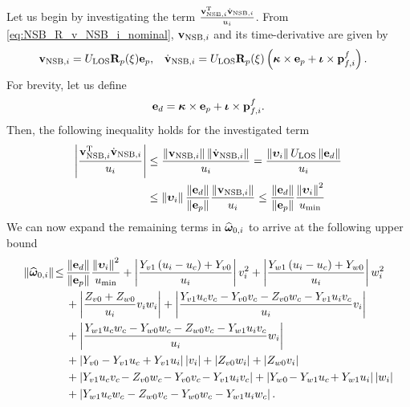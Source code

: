 Let us begin by investigating the term $\frac{\mathbf{v}_{{\rm NSB}, i}^{\mathrm{T}}\dot{\mathbf{v}}_{{\rm NSB}, i}}{u_i}$.
From \eqref{eq:NSB_R_v_NSB_i_nominal}, $\mathbf{v}_{{\rm NSB}, i}$ and its time-derivative are given by
\begin{align}
    \mathbf{v}_{{\rm NSB}, i} &= U_{\rm LOS}\mathbf{R}_p(\xi)\mathbf{e}_p, &
    \dot{\mathbf{v}}_{{\rm NSB}, i} &= U_{\rm LOS}\mathbf{R}_p(\xi)\left(\bm{\kappa}\times\mathbf{e}_p + \bm{\iota}\times\mathbf{p}_{f,i}^f\right).
\end{align}
For brevity, let us define
\begin{equation}
    \mathbf{e}_d = \bm{\kappa}\times\mathbf{e}_p + \bm{\iota}\times\mathbf{p}_{f,i}^f.
\end{equation}
Then, the following inequality holds for the investigated term
\begin{equation}
\begin{split}
    \left|\frac{\mathbf{v}_{{\rm NSB}, i}^{\mathrm{T}}\dot{\mathbf{v}}_{{\rm NSB}, i}}{u_i}\right| &\leq
    \frac{\left\|\mathbf{v}_{{\rm NSB}, i}\right\|\left\|\dot{\mathbf{v}}_{{\rm NSB}, i}\right\|}{u_i} =
    \frac{\left\|\bm{\upsilon}_i\right\|U_{\rm LOS}\left\|\mathbf{e}_d\right\|}{u_i} \\
    &\leq \left\|\bm{\upsilon}_i\right\|\frac{\left\|\mathbf{e}_d\right\|}{\left\|\mathbf{e}_p\right\|}\frac{\left\|\mathbf{v}_{{\rm NSB}, i}\right\|}{u_i}
    \leq \frac{\left\|\mathbf{e}_d\right\|}{\left\|\mathbf{e}_p\right\|}\frac{\left\|\bm{\upsilon}_i\right\|^2}{u_{\rm min}}
\end{split}
\end{equation}
We can now expand the remaining terms in $\widehat{\bm{\omega}}_{0, i}$ to arrive at the following upper bound
\begin{equation}
\begin{split}
    \left\|\widehat{\bm{\omega}}_{0, i}\right\|\! \leq\, &
    \frac{\left\|\mathbf{e}_d\right\|}{\left\|\mathbf{e}_p\right\|}\frac{\left\|\bm{\upsilon}_i\right\|^2}{u_{\rm min}}
    + \left|\frac{Y_{v1}\left(u_i-u_c\right) + Y_{v0}}{u_i}\right|v_i^2
    + \left|\frac{Y_{w1}\left(u_i-u_c\right) + Y_{w0}}{u_i}\right|w_i^2 \\
    &+ \left|\frac{Z_{v0}+Z_{w0}}{u_i}v_iw_i\right| + \left|\frac{Y_{v1}u_cv_c - Y_{v0}v_c - Z_{v0}w_c - Y_{v1}u_iv_c}{u_i}v_i\right| \\
    &+ \left|\frac{Y_{w1}u_cw_c - Y_{w0}w_c - Z_{w0}v_c - Y_{w1}u_iv_c}{u_i}w_i\right| \\
    &+ \left|Y_{v0}-Y_{v1}u_c+Y_{v1}u_i\right|\left|v_i\right| + \left|Z_{v0}w_i\right| + \left|Z_{w0}v_i\right| \\
    &+ \left|Y_{v1}u_cv_{c\!} - Z_{v0}w_{c\!} - Y_{v0}v_{c\!} - Y_{v1}u_iv_c\right| + \left|Y_{w0\!}-Y_{w1}u_{c\!}+Y_{w1}u_i\right|\left|w_i\right| \\
    &+ \left|Y_{w1}u_cw_c - Z_{w0}v_c - Y_{w0}w_c - Y_{w1}u_iw_c\right|.
\end{split}
\end{equation}
